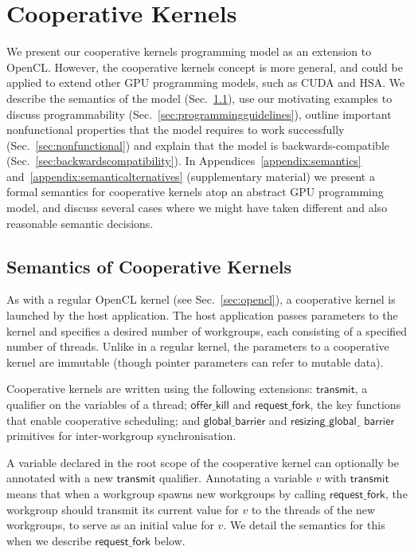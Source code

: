 \documentclass[parskip=half,sigconf,review, anonymous=true, acmcopyrightmode=none]{acmart}
\newcommand{\mysec}{Sec.~}
\newcommand{\transmit}{\mathsf{transmit}}
\newcommand{\offerfork}{\mathsf{request\_fork}}
\newcommand{\offerkill}{\mathsf{offer\_kill}}
\newcommand{\globalbarrier}{\mathsf{global\_barrier}}
\newcommand{\resizingglobalbarrier}{\mathsf{resizing\_global\_barrier}}
\begin{document}
\section{Cooperative Kernels}\label{sec:cooperativekernels}

We present our cooperative kernels programming model as an extension
to OpenCL.  However, the cooperative kernels concept is more general,
and could be applied to extend other GPU programming models, such as
CUDA and HSA.  We describe the semantics of the model
(\mysec\ref{sec:semantics}), use our motivating examples to discuss
programmability (\mysec\ref{sec:programmingguidelines}), outline
important nonfunctional properties that the model requires to work
successfully (\mysec\ref{sec:nonfunctional}) and explain that the
model is backwards-compatible
(\mysec\ref{sec:backwardscompatibility}).
%
In Appendices~\ref{appendix:semantics} and~\ref{appendix:semanticalternatives} (supplementary material)
we present a formal semantics for cooperative kernels atop an abstract GPU programming model,
and discuss several cases where we
might have taken different and also reasonable semantic decisions.

\subsection{Semantics of Cooperative Kernels}\label{sec:semantics}

As with a regular OpenCL kernel (see \mysec\ref{sec:opencl}), a
cooperative kernel is launched by the host application.  The host
application passes parameters to the kernel and specifies a desired
number of workgroups, each consisting of a specified number of
threads.  Unlike in a regular kernel, the parameters to a cooperative kernel are immutable (though pointer
parameters can refer to mutable data).

Cooperative kernels are written using the following
extensions: $\transmit$, a qualifier on the variables of a
thread; $\offerkill$ and $\offerfork$, the key functions that enable
cooperative scheduling; and $\globalbarrier$ and $\mathsf{resizing\_global\_}$ $\mathsf{barrier}$
primitives for inter-workgroup synchronisation.

%
A variable declared in the root scope of the cooperative kernel can
optionally be annotated with a new $\transmit$ qualifier.  Annotating
a variable $v$ with $\transmit$ means that when a workgroup spawns new
workgroups by calling $\offerfork$, the workgroup should transmit its
current value for $v$ to the threads of the new workgroups, to serve
as an initial value for $v$.  We detail the semantics for this when we
describe $\offerfork$ below.
\end{document}

